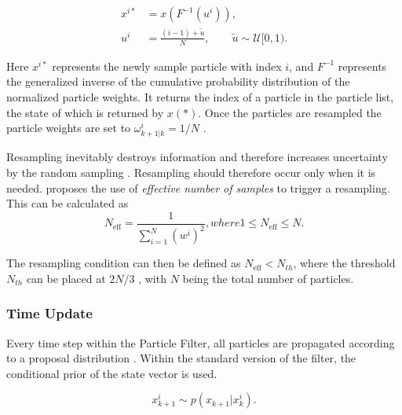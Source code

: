 \begin{align}
	x^{i*} &= x(F^{-1}(u^i)), \\
	u^i &= \frac{(i-1) + \tilde{u}}{N}, \qquad \tilde{u} \sim \mathcal{U}[0,1).
\end{align}	

Here $x^{i*}$ represents the newly sample particle with index $i$, and $F^{-1}$ represents the generalized inverse of the cumulative probability distribution of the normalized particle weights. It returns the index of a particle in the particle list, the state of which is returned by $x(*)$. Once the particles are resampled the particle weights are set to $\omega^i_{k+1|k} = 1/N$ . \par
Resampling inevitably destroys information and therefore increases uncertainty by the random sampling \cite{gustafsson2010particle}. Resampling should therefore occur only when it is needed. \citet{gustafsson2010statistical} proposes the use of  \textit{effective number of samples} to trigger a  resampling. This can be calculated as 
\begin{subequations}
	\begin{equation}
		N_{\mathrm{eff}}=\frac{1}{\sum_{i=1}^{N}\left(w^{i}\right)^{2}},
	\end{equation}
	
	where
	
	\begin{equation}
		1 \leq N_{\mathrm{eff}} \leq N.
	\end{equation}
\end{subequations}

The resampling condition can then be defined as $N_{\mathrm{eff}} < N_{th}$, where the threshold $ N_{th} $ can be placed at $2N/3$ \cite{gustafsson2010statistical}, with $N$ being the total number of particles. \par 

\subsubsection{Time Update}
Every time step within the Particle Filter, all particles are propagated according to a proposal distribution \cite{gustafsson2010particle}. Within the standard version of the filter, the conditional prior of the state vector is used. 

\begin{equation}
	x_{k+1}^{i} \sim p(x_{k+1}|x^i_{k}).
\end{equation}


